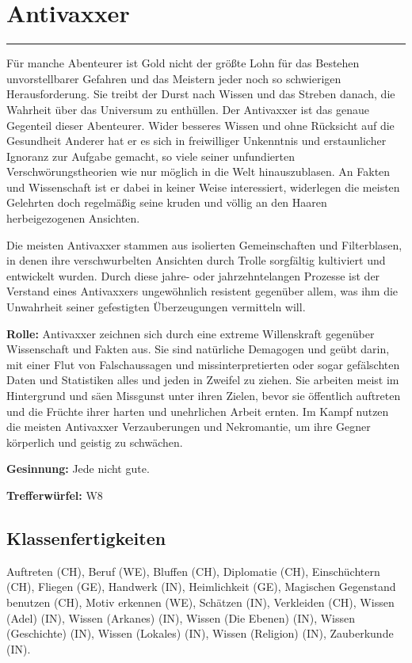 \documentclass[
	ngerman,
	a4paper,
	10pt,
	twocolumn,
]{scrartcl}
\begin{document}
\section*{Antivaxxer}

\rule[2ex]{0.49\textwidth}{1pt}

Für manche Abenteurer ist Gold nicht der größte Lohn für das Bestehen unvorstellbarer Gefahren und das Meistern jeder noch so schwierigen Herausforderung. Sie treibt der Durst nach Wissen und das Streben danach, die Wahrheit über das Universum zu enthüllen. Der Antivaxxer ist das genaue Gegenteil dieser Abenteurer. Wider besseres Wissen und ohne Rücksicht auf die Gesundheit Anderer hat er es sich in freiwilliger Unkenntnis und erstaunlicher Ignoranz zur Aufgabe gemacht, so viele seiner unfundierten Verschwörungstheorien wie nur möglich in die Welt hinauszublasen. An Fakten und Wissenschaft ist er dabei in keiner Weise interessiert, widerlegen die meisten Gelehrten doch regelmäßig seine kruden und völlig an den Haaren herbeigezogenen Ansichten.

Die meisten Antivaxxer stammen aus isolierten Gemeinschaften und Filterblasen, in denen ihre verschwurbelten Ansichten durch Trolle sorgfältig kultiviert und entwickelt wurden. Durch diese jahre- oder jahrzehntelangen Prozesse ist der Verstand eines Antivaxxers ungewöhnlich resistent gegenüber allem, was ihm die Unwahrheit seiner gefestigten Überzeugungen vermitteln will.

\textbf{Rolle:} Antivaxxer zeichnen sich durch eine extreme Willenskraft gegenüber Wissenschaft und Fakten aus. Sie sind natürliche Demagogen und geübt darin, mit einer Flut von Falschaussagen und missinterpretierten oder sogar gefälschten Daten und Statistiken alles und jeden in Zweifel zu ziehen. Sie arbeiten meist im Hintergrund und säen Missgunst unter ihren Zielen, bevor sie öffentlich auftreten und die Früchte ihrer harten und unehrlichen Arbeit ernten. Im Kampf nutzen die meisten Antivaxxer Verzauberungen und Nekromantie, um ihre Gegner körperlich und geistig zu schwächen.

\textbf{Gesinnung:} Jede nicht gute.

\textbf{Trefferwürfel:} W8

\subsection*{Klassenfertigkeiten}

Auftreten (CH), Beruf (WE), Bluffen (CH), Diplomatie (CH), Einschüchtern (CH), Fliegen (GE), Handwerk (IN), Heimlichkeit (GE), Magischen Gegenstand benutzen (CH), Motiv erkennen (WE), Schätzen (IN), Verkleiden (CH), Wissen (Adel) (IN), Wissen (Arkanes) (IN), Wissen (Die Ebenen) (IN), Wissen (Geschichte) (IN), Wissen (Lokales) (IN), Wissen (Religion) (IN), Zauberkunde (IN).
\end{document}
